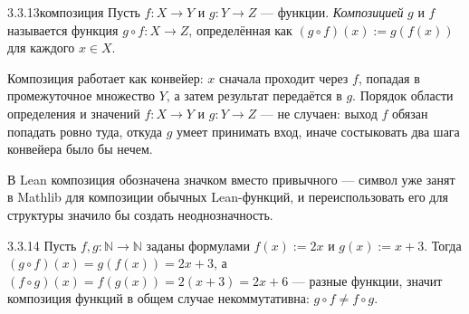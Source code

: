 \begin{definition}{3.3.13}{композиция}
Пусть $f:X\to Y$ и $g:Y\to Z$ — функции. \emph{Композицией} $g$ и $f$ называется функция
$g\circ f:X\to Z$, определённая как $(g\circ f)(x):=g(f(x))$ для каждого $x\in X$.
\end{definition}

\begin{intuition}
Композиция работает как конвейер: $x$ сначала проходит через $f$, попадая в промежуточное
множество $Y$, а затем результат передаётся в $g$. Порядок области определения и значений
$f:X\to Y$ и $g:Y\to Z$ — не случаен: выход $f$ обязан попадать ровно туда, откуда $g$ умеет
принимать вход, иначе состыковать два шага конвейера было бы нечем.

\begin{center}
\end{center}
\end{intuition}

\begin{remark}
В Lean композиция обозначена значком  вместо привычного  — символ 
уже занят в Mathlib для композиции обычных Lean-функций, и переиспользовать его для структуры
 значило бы создать неоднозначность.
\end{remark}

\begin{example}{3.3.14}{}
Пусть $f,g:\mathbb{N}\to\mathbb{N}$ заданы формулами $f(x):=2x$ и $g(x):=x+3$. Тогда
$(g\circ f)(x)=g(f(x))=2x+3$, а $(f\circ g)(x)=f(g(x))=2(x+3)=2x+6$ — разные функции, значит
композиция функций в общем случае некоммутативна: $g\circ f \neq f\circ g$.
\end{example}

